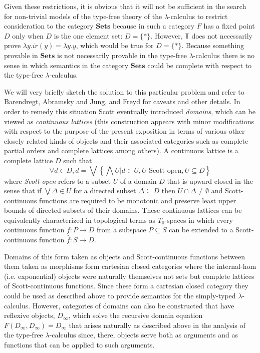 Given these restrictions, it is obvious that it will not be sufficient in the search for non-trivial models of the type-free theory of the $\lambda$-calculus to restrict consideration to the category $\mathbf{Sets}$ because in such a category $F$ has a fixed point $D$ only when $D$ is the one element set: $D = \{*\}$. However, $\mathbb{T}$ does not necessarily prove $\lambda y.ir(y)=\lambda y.y$, which would be true for $D = \{*\}$. Because something provable in $\mathbf{Sets}$ is not necessarily provable in the type-free $\lambda$-calculus there is no sense in which semantics in the category $\mathbf{Sets}$ could be complete with respect to the type-free $\lambda$-calculus.

We will very briefly sketch the solution to this particular problem and refer to Barendregt, Abramsky and Jung, and Freyd for caveats and other details. In order to remedy this situation Scott eventually introduced \emph{domains}, which can be viewed as \emph{continuous lattices} (this construction appears with minor modifications with respect to the purpose of the present exposition in terms of various other closely related kinds of objects and their associated categories such as complete partial orders and complete lattices among others). A continuous lattice is a complete  lattice $D$ such that
$$
\forall d \in D, d = \bigvee \left\{ \bigwedge U | d \in U, U \mbox{ Scott-open}, U \subseteq D \right\}
$$
where \emph{Scott-open} refers to a subset $U$ of a domain $D$ that is upward closed in the sense that if $\bigvee \Delta \in U$ for a directed subset $\Delta \subseteq D$ then $U \cap \Delta \neq \emptyset$ and Scott-continuous functions are required to be monotonic and preserve least upper bounds of directed subsets of their domains. These continuous lattices can be equivalently characterized in topological terms as $T_0$-spaces in which every continuous function $f \colon P \rightarrow D$ from a subspace $P \subseteq S$ can be extended to a Scott-continuous function $\hat{f} \colon S \rightarrow D$.

Domains of this form taken as objects and Scott-continuous functions between them taken as morphisms form cartesian closed categories where the internal-hom (i.e. exponential) objects were naturally themselves not sets but complete lattices of Scott-continuous functions. Since these form a cartesian closed category they could be used as described above to provide semantics for the simply-typed $\lambda$-calculus. However, categories of domains can also be constructed that have reflexive objects, $D_\infty$, which solve the recursive domain equation $F(D_{\infty},D_{\infty})=D_{\infty}$ that arises naturally as described above in the analysis of the type-free $\lambda$-calculus since, there, objects serve both as arguments and as functions that can be applied to such arguments.

